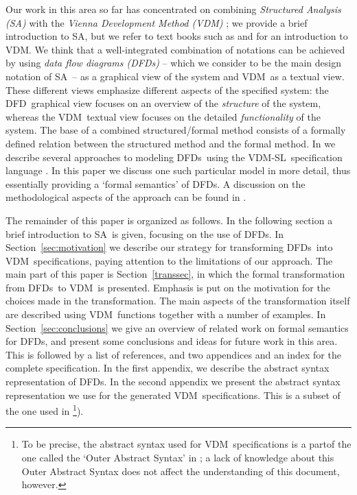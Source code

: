 \documentclass[11pt]{article}
\newcommand{\SA}{{\small SA}}
\newcommand{\VDM}{{\small VDM}}
\newcommand{\VDMSL}{{\small VDM-SL}}
\newcommand{\DFD}{{\small DFD}}
\newcommand{\DFDs}{{\small DFD}s}
\begin{document}
Our work in this area so far has concentrated on combining {\em Structured
Analysis (SA)} \cite{Yourdon75,Demarco78,Gane77}
with the {\em Vienna Development Method (VDM)}
\cite{Bjorner&82b,Jones90a}; we provide a brief introduction to
\SA, but we refer to text books such as \cite{Jones90a} and
\cite{Andrews&91} for an introduction to \VDM.
We think that a well-integrated combination of notations can be achieved
by using {\em data flow diagrams (DFDs)} -- which we consider to be the main
design notation of \SA\ --
as a graphical view of the system and \VDM\ as a textual
view. These different views emphasize different aspects of the
specified system: the \DFD\ graphical view
focuses on an overview of the {\em structure} of the system, whereas
the \VDM\ textual view focuses on the detailed {\em functionality} of the system.
The base of a combined structured/formal method consists of a formally defined
relation between the structured method and the formal method.
In \cite{Plat&91a} we describe several approaches to modeling \DFDs\ 
using the \VDMSL\ specification language \cite{BSIVDM92b,Dawes91}.
In this paper we discuss one such particular model in more detail,
thus essentially providing a `formal semantics' of \DFDs.
A discussion on the methodological aspects of the approach can be found in
\cite{Larsen&91b}.

The remainder of this paper is organized as follows.
In the following section a brief introduction to \SA\ is given, focusing on the
use of \DFDs.
In Section~\ref{sec:motivation} we describe our strategy for
transforming \DFDs\ into \VDM\ specifications, paying attention to the
limitations of our approach.
The main part of this paper is Section~\ref{transsec}, in which the formal
transformation from \DFDs\ to \VDM\ is presented.
Emphasis is put on the motivation for the choices
made in the transformation. The main aspects of the transformation
itself are described using \VDM\ functions together
with a number of examples.
In Section~\ref{sec:conclusions} we give an overview of related
work on formal semantics for \DFDs, and present some conclusions and
ideas for future work in this area.
This is followed by a list of references, and two appendices and an
index for the complete specification.
In the first appendix, we describe the abstract syntax representation
of \DFDs. In the second appendix we present the abstract syntax 
representation we use for the generated
\VDM\ specifications. This is a subset of the one used
in \cite{BSIVDM92b}\footnote{%
To be precise, the abstract syntax used for \VDM\ specifications is
a partof the one
called the `Outer Abstract Syntax' in \cite{BSIVDM92b}; a lack of knowledge about
this Outer Abstract Syntax
does not affect the understanding of this document, however.}).
\end{document}
